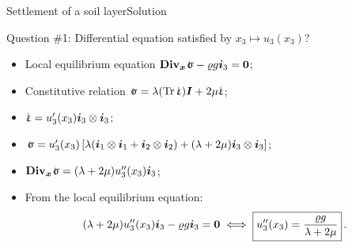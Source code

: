 \documentclass{beamer}
\newcommand{\trace}{\operatorname{Tr}}
\newcommand{\Id}{{\boldsymbol I}}
\newcommand{\uj}{u}
\newcommand{\xj}{x}
\newcommand{\xv}{{\boldsymbol\xj}}
\newcommand{\Div}{\mathbf{Div}}
\newcommand{\Divx}{{\Div_\xv}}
\renewcommand{\ij}{i}
\newcommand{\iv}{{\boldsymbol\ij}}
\newcommand*{\strain}{\mbox{$\hspace{0.2em}\rotatebox[x=0pt,y=0.2pt]{90}{\rule{0.02\linewidth}{0.4pt}}\hspace{-0.23em}\upvarepsilon$}}
\newcommand{\roi}{\varrho}
\newcommand{\stress}{\mbox{$\hspace{0.3em}\rotatebox[x=0pt,y=0.2pt]{90}{\rule{0.017\linewidth}{0.4pt}}\hspace{-0.25em}\upsigma$}}
\newcommand{\bzero}{{\bf 0}}
\begin{document}
\begin{frame}{Settlement of a soil layer}{Solution}
\begin{overprint}
\vskip-20pt
\begin{exampleblock}{Question \#1: Differential equation satisfied by $\xj_3\mapsto\uj_3(\xj_3)$?}
\begin{itemize}
\item Local equilibrium equation $\Divx\stress-\roi g\iv_3=\bzero$;
\item Constitutive relation $\stress=\lambda(\trace\strain)\Id+2\mu\strain$;
\item $\strain=\uj_3'(\xj_3)\iv_3\otimes\iv_3$;
\item $\stress=\uj_3'(\xj_3)\left[\lambda(\iv_1\otimes\iv_1+\iv_2\otimes\iv_2)+(\lambda+2\mu)\iv_3\otimes\iv_3\right]$;
\item $\Divx\stress=(\lambda+2\mu)\uj_3''(\xj_3)\iv_3$;
\item From the local equilibrium equation: 
\begin{displaymath}
(\lambda+2\mu)\uj_3''(\xj_3)\iv_3-\roi g\iv_3=\bzero \iff \boxed{\uj_3''(\xj_3)=\frac{\roi g}{\lambda+2\mu}}\,.
\end{displaymath}
\end{itemize}
\end{exampleblock}

\end{overprint}

\end{frame}
\end{document}
